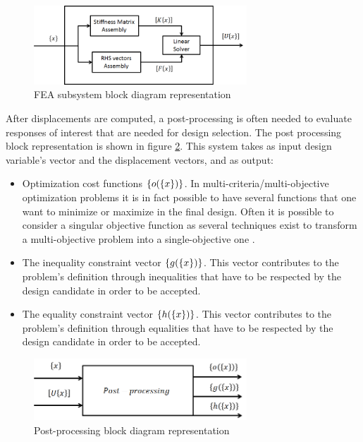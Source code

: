 \begin{figure}[ht]
\centering
\includegraphics[width=8cm]{images/Ch2/Block_diagram_FEA_det}
\caption{FEA subsystem block diagram representation}
\label{fig.2.3}
\end{figure}
After displacements are computed, a post-processing is often needed to evaluate responses of interest that are needed for design selection.
The post processing block representation is shown in figure \ref{fig.2.4}. This system takes as input design variable's vector and the displacement vectors, and as output:
\begin{itemize}
\item Optimization cost functions $\left\lbrace{o(\ensuremath\left\lbrace{x}\right \rbrace)}\right \rbrace$. In multi-criteria/multi-objective optimization problems it is in fact possible to have several functions that one want to minimize or maximize in the final design. Often it is possible to consider a singular objective function as several techniques exist to transform a multi-objective problem into a single-objective one \cite{marler2004survey}.
\item The inequality constraint vector $\left\lbrace{g(\ensuremath\left\lbrace{x}\right \rbrace)}\right \rbrace$. This vector contributes to the problem's definition through inequalities that have to be respected by the design candidate in order to be accepted.
\item The equality constraint vector $\left\lbrace{h(\ensuremath\left\lbrace{x}\right \rbrace)}\right \rbrace$. This vector contributes to the problem's definition through equalities that have to be respected by the design candidate in order to be accepted.
\end{itemize} 
\begin{figure}[ht]
\centering
\includegraphics[width=8cm]{images/Ch2/Post_processing}
\caption{Post-processing block diagram representation}
\label{fig.2.4}
\end{figure}
